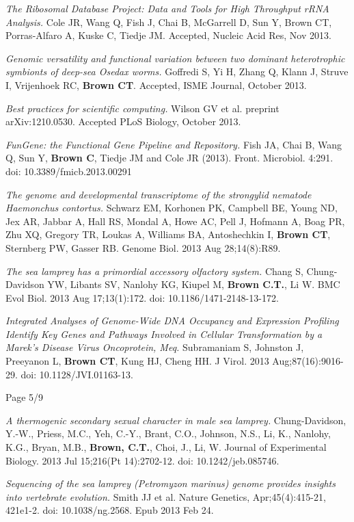 \documentclass[margin,line]{resume}
\begin{document}
\begin{resume}
{\em The Ribosomal Database Project: Data and Tools for High Throughput rRNA Analysis.} Cole JR, Wang Q, Fish J, Chai B, McGarrell D, Sun Y, Brown CT, Porras-Alfaro A, Kuske C, Tiedje JM.  Accepted, Nucleic Acid Res, Nov 2013.

{\em Genomic versatility and functional variation between two dominant
heterotrophic symbionts of deep-sea {\rm Osedax} worms.} Goffredi S, Yi H, Zhang Q, Klann J, Struve I, Vrijenhoek RC, {\bf Brown CT}. Accepted, ISME Journal, October 2013.

{\em Best practices for scientific computing.} Wilson GV et al. preprint arXiv:1210.0530. Accepted PLoS Biology, October 2013.

{\em FunGene: the Functional Gene Pipeline and Repository.} Fish JA, Chai B, Wang Q, Sun Y, {\bf Brown C}, Tiedje JM and Cole JR (2013).  Front. Microbiol. 4:291. doi: 10.3389/fmicb.2013.00291

{\em The genome and developmental transcriptome of the strongylid
  nematode Haemonchus contortus.}  Schwarz EM, Korhonen PK, Campbell
BE, Young ND, Jex AR, Jabbar A, Hall RS, Mondal A, Howe AC, Pell J,
Hofmann A, Boag PR, Zhu XQ, Gregory TR, Loukas A, Williams BA,
Antoshechkin I, {\bf Brown CT}, Sternberg PW, Gasser RB.  Genome
Biol. 2013 Aug 28;14(8):R89.

{\em The sea lamprey has a primordial accessory olfactory system.}
Chang S, Chung-Davidson YW, Libants SV, Nanlohy KG, Kiupel M, {\bf
  Brown C.T.}, Li W. BMC Evol Biol. 2013 Aug 17;13(1):172. doi:
10.1186/1471-2148-13-172.

{\em Integrated Analyses of Genome-Wide DNA Occupancy and Expression
  Profiling Identify Key Genes and Pathways Involved in Cellular
  Transformation by a Marek's Disease Virus Oncoprotein, Meq.}
Subramaniam S, Johnston J, Preeyanon L, {\bf Brown CT}, Kung HJ, Cheng
HH. J Virol. 2013 Aug;87(16):9016-29. doi: 10.1128/JVI.01163-13.

\vspace{1cm}
{\centerline {Page 5/9}}

\newpage

{\em A thermogenic secondary sexual character in male sea lamprey.}
Chung-Davidson, Y.-W., Priess, M.C., Yeh, C.-Y., Brant, C.O., Johnson,
N.S., Li, K., Nanlohy, K.G., Bryan, M.B., {\bf Brown, C.T.}, Choi, J.,
Li, W. Journal of Experimental Biology. 2013 Jul 15;216(Pt
14):2702-12. doi: 10.1242/jeb.085746.

{\em Sequencing of the sea lamprey (Petromyzon marinus) genome provides insights into vertebrate evolution.} Smith JJ et al. Nature Genetics, Apr;45(4):415-21, 421e1-2. doi: 10.1038/ng.2568. Epub 2013 Feb 24.


\end{resume}
\end{document}
